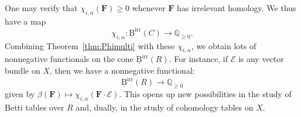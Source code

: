 \documentclass[12pt]{amsart}
\theoremstyle{definition}
\theoremstyle{remark}
\newcommand{\QQ}{\mathbb{Q}}
\newcommand{\cE}{\mathcal{E}}
\newcommand{\FF}{\mathbf{F}}
\newcommand{\BBirr}{\underline{\mathrm{B}}^{\text{irr}}}
\begin{document}
One may verify that $\chi_{i,\alpha}(\FF)\geq 0$ whenever $\FF$ has irrelevant homology.  We thus have a map
\[
\chi_{i,\alpha}: \BBirr(C)\to \QQ_{\geq 0}.
\]
Combining Theorem~\ref{thm:Phimulti} with these $\chi_{i,\alpha}$, we obtain lots of nonnegative functionals on the cone $\BBirr(R)$.  For instance, if $\cE$ is any vector bundle on $X$, then we have a nonnegative functional:
\[
\BBirr(R)\to \QQ_{\geq 0}
\]
given by $\beta(\FF)\mapsto \chi_{i,\alpha}(\FF\cdot \cE)$.  This opens up new possibilities in the study of Betti tables over $R$ and, dually, in the study of cohomology tables on $X$.


\end{document}
